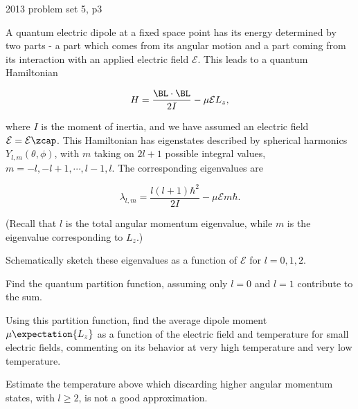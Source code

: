 {2013 problem set 5, p3}{
A quantum electric dipole at a fixed space point has its energy determined by two parts - a part which comes from its angular motion and a part coming from its interaction with an applied electric field $\mathcal{E}$. This leads to a quantum Hamiltonian

\begin{equation}\label{eqn:basicStatMechProblemSet5Problem3:20}
H = \frac{\BL \cdot \BL}{2 I} - \mu \mathcal{E} L_z,
\end{equation}

where $I$ is the moment of inertia, and we have assumed an electric field $\mathcal{E} = \mathcal{E} \zcap$.  This Hamiltonian has eigenstates described by spherical harmonics $Y_{l, m}(\theta, \phi)$, with $m$ taking on $2l+1$ possible integral values, $m = -l, -l + 1, \cdots, l -1, l$.  The corresponding eigenvalues are

\begin{equation}\label{eqn:basicStatMechProblemSet5Problem3:40}
\lambda_{l, m} = \frac{l(l+1) \hbar^2}{2I} - \mu \mathcal{E} m \hbar.
\end{equation}

(Recall that $l$ is the total angular momentum eigenvalue, while $m$ is the eigenvalue corresponding to $L_z$.) 

Schematically sketch these eigenvalues as a function of $\mathcal{E}$ for $l = 0,1,2$.  

Find the quantum partition function, assuming only $l = 0$ and $l = 1$ contribute to the sum.  

Using this partition function, find the average dipole moment $\mu \expectation{L_z}$ as a function of the electric field and temperature for small electric fields, commenting on its behavior at very high temperature and very low temperature.  

Estimate the temperature above which discarding higher angular momentum states, with $l \ge 2$, is not a good approximation.
} %

